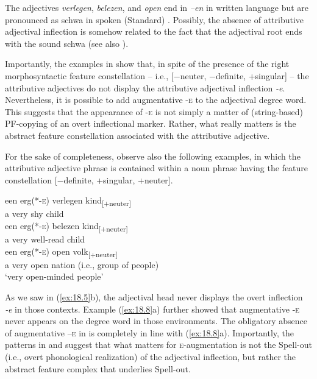 \documentclass[output=paper]{langsci/langscibook}
\begin{document}
The adjectives \emph{verlegen}, \emph{belezen}, and \emph{open} end in
\emph{–en} in written language but are pronounced as schwa in spoken (Standard)
. Possibly, the absence of attributive adjectival inflection is
somehow related to the fact that the adjectival root ends with the sound schwa
(see also \citealt{Broekhuis2013}).

Importantly, the examples in  show that, in spite of the
presence of the right morphosyntactic feature constellation – i.e., [−neuter,
−definite, +singular] – the attributive adjectives do not display the
attributive adjectival inflection \emph{-e}. Nevertheless, it is possible to
add augmentative \textsc{-e} to the adjectival degree word.
This suggests that the appearance of \textsc{-e} is not simply a matter of
(string-based) \gls{PF}-copying of an overt inflectional marker. Rather, what
really matters is the abstract feature constellation associated with the
attributive adjective.

For the sake of completeness, observe also the following examples, in which the
attributive adjective phrase is contained within a noun phrase having the
feature constellation [−definite, +singular, +neuter].

\ea%
    \label{ex:18.23}
	\ea
	\gll een  erg(*-\textsc{e})    verlegen    kind\textsubscript{[+neuter]}\\
		 a        very            shy              child\\
	\ex
	\gll een  erg(*-\textsc{e})    belezen      kind\textsubscript{[+neuter]}\\
		a        very          well-read  child\\
	\ex
	\gll een  erg(*-\textsc{e})    open  volk\textsubscript{[+neuter]}\\
		a        very          open  nation (i.e., group of people)\\
	\glt \enquote*{very open-minded people}
	\z
\z

As we saw in (\ref{ex:18.5}b), the adjectival head never displays the overt
inflection \emph{‑e} in those contexts. Example (\ref{ex:18.8}a) further showed
that augmentative -\textsc{e} never appears on the degree word in those
environments. The obligatory absence of augmentative –\textsc{e} in
 is completely in line with (\ref{ex:18.8}a). Importantly, the
patterns in  and  suggest that what matters for
\textsc{e}-augmentation is not the Spell-out (i.e., overt phonological
realization) of the adjectival inflection, but rather the abstract feature
complex that underlies Spell-out.
\end{document}
